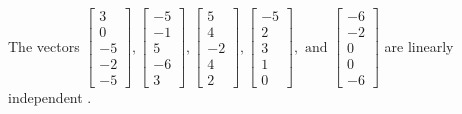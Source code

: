 \begin{exercise}
\begin{exerciseStatement}
  \end{exerciseStatement}
  \begin{exerciseAnswer}
   The vectors \(\left[\begin{array}{r}
3 \\
0 \\
-5 \\
-2 \\
-5
\end{array}\right] , \left[\begin{array}{r}
-5 \\
-1 \\
5 \\
-6 \\
3
\end{array}\right] , \left[\begin{array}{r}
5 \\
4 \\
-2 \\
4 \\
2
\end{array}\right] , \left[\begin{array}{r}
-5 \\
2 \\
3 \\
1 \\
0
\end{array}\right] , \text{ and } \left[\begin{array}{r}
-6 \\
-2 \\
0 \\
0 \\
-6
\end{array}\right]\) are 
  	 linearly independent  .
  


  \end{exerciseAnswer}
\end{exercise}